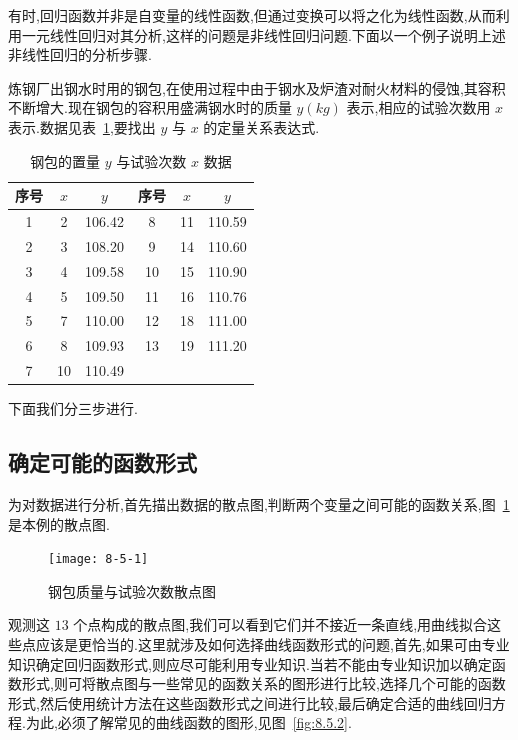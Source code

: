 有时,回归函数并非是自变量的线性函数,但通过变换可以将之化为线性函数,从而利用一元线性回归对其分析,这样的问题是非线性回归问题.下面以一个例子说明上述非线性回归的分析步骤.
\begin{example}
    炼钢厂出钢水时用的钢包,在使用过程中由于钢水及炉渣对耐火材料的侵蚀,其容积不断增大.现在钢包的容积用盛满钢水时的质量 $y(kg)$ 表示,相应的试验次数用 $x$ 表示.数据见表~\ref{tab:8.5.1},要找出 $y$ 与 $x$ 的定量关系表达式.
    \begin{table}[htbp]
      \renewcommand*{\arraystretch}{1.5}
        \centering
        \caption{钢包的置量 $y$ 与试验次数 $x$ 数据}
        \begin{tabular}{ccc|ccc}
            \hline
            序号    &  $x$     & $y$     & 序号    & $x$    & $y$ \\\hline
            1     & 2     & 106.42  & 8     & 11    & 110.59  \\
            2     & 3     & 108.20  & 9     & 14    & 110.60  \\
            3     & 4     & 109.58  & 10    & 15    & 110.90  \\
            4     & 5     & 109.50  & 11    & 16    & 110.76  \\
            5     & 7     & 110.00  & 12    & 18    & 111.00  \\
            6     & 8     & 109.93  & 13    & 19    & 111.20  \\
            7     & 10    & 110.49  &       &       &  \\\hline
        \end{tabular}%
        \label{tab:8.5.1}%
    \end{table}%
    
    下面我们分三步进行.
    
    \subsection{确定可能的函数形式}
    
    为对数据进行分析,首先描出数据的散点图,判断两个变量之间可能的函数关系,图~\ref{fig:8.5.1} 是本例的散点图.
    
    \begin{figure}[!htb]
    \centering
    \texttt{[image: 8-5-1]}
    \caption{钢包质量与试验次数散点图}
    \label{fig:8.5.1}
    \end{figure}

    观测这 $13$ 个点构成的散点图,我们可以看到它们并不接近一条直线,用曲线拟合这些点应该是更恰当的.这里就涉及如何选择曲线函数形式的问题,首先,如果可由专业知识确定回归函数形式,则应尽可能利用专业知识.当若不能由专业知识加以确定函数形式,则可将散点图与一些常见的函数关系的图形进行比较,选择几个可能的函数形式,然后使用统计方法在这些函数形式之间进行比较,最后确定合适的曲线回归方程.为此,必须了解常见的曲线函数的图形,见图~\ref{fig:8.5.2}.


\end{example}
